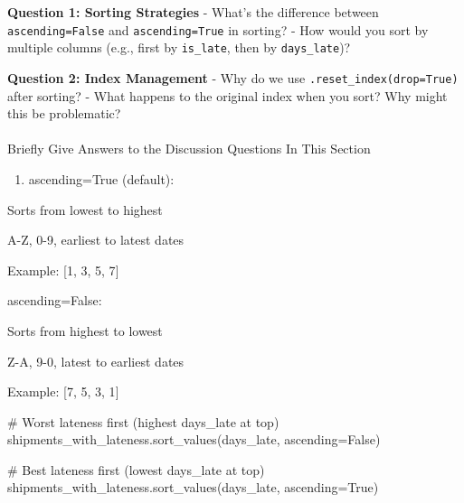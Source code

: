 \documentclass[
  letterpaper,
  DIV=11,
  numbers=noendperiod]{scrartcl}
\makeatletter
\let\oldparagraph\paragraph
\renewcommand{\paragraph}{
    \@ifstar
      \xxxParagraphStar
      \xxxParagraphNoStar
  }
\newcommand{\xxxParagraphStar}[1]{\oldparagraph*{#1}\mbox{}}
\newcommand{\xxxParagraphNoStar}[1]{\oldparagraph{#1}\mbox{}}
\newenvironment{Shaded}{\begin{snugshade}}{\end{snugshade}}
\newcommand{\CommentTok}[1]{\textcolor[rgb]{0.37,0.37,0.37}{#1}}
\newcommand{\NormalTok}[1]{\textcolor[rgb]{0.00,0.23,0.31}{#1}}
\newcommand{\OperatorTok}[1]{\textcolor[rgb]{0.37,0.37,0.37}{#1}}
\newcommand{\StringTok}[1]{\textcolor[rgb]{0.13,0.47,0.30}{#1}}
\newcommand{\VariableTok}[1]{\textcolor[rgb]{0.07,0.07,0.07}{#1}}
\providecommand{\tightlist}{%
  \setlength{\itemsep}{0pt}\setlength{\parskip}{0pt}}
\makeatother
\begin{document}
\begin{tcolorbox}[enhanced jigsaw, toptitle=1mm, opacityback=0, colframe=quarto-callout-important-color-frame, leftrule=.75mm, arc=.35mm, opacitybacktitle=0.6, breakable, titlerule=0mm, coltitle=black, bottomtitle=1mm, title=\textcolor{quarto-callout-important-color}{\faExclamation}\hspace{0.5em}{🤔 Discussion Questions: Sort Mental Model}, colbacktitle=quarto-callout-important-color!10!white, rightrule=.15mm, left=2mm, bottomrule=.15mm, toprule=.15mm, colback=white]

\textbf{Question 1: Sorting Strategies} - What's the difference between
\texttt{ascending=False} and \texttt{ascending=True} in sorting? - How
would you sort by multiple columns (e.g., first by \texttt{is\_late},
then by \texttt{days\_late})?

\textbf{Question 2: Index Management} - Why do we use
\texttt{.reset\_index(drop=True)} after sorting? - What happens to the
original index when you sort? Why might this be problematic?

\end{tcolorbox}

\paragraph{Briefly Give Answers to the Discussion Questions In This
Section}\label{briefly-give-answers-to-the-discussion-questions-in-this-section-3}

\begin{enumerate}
\def\labelenumi{\arabic{enumi}.}
\tightlist
\item
  ascending=True (default):
\end{enumerate}

Sorts from lowest to highest

A-Z, 0-9, earliest to latest dates

Example: {[}1, 3, 5, 7{]}

ascending=False:

Sorts from highest to lowest

Z-A, 9-0, latest to earliest dates

Example: {[}7, 5, 3, 1{]}

\begin{Shaded}
\begin{Highlighting}[]
\CommentTok{\# Worst lateness first (highest days\_late at top)}
\NormalTok{shipments\_with\_lateness.sort\_values(}\StringTok{\textquotesingle{}days\_late\textquotesingle{}}\NormalTok{, ascending}\OperatorTok{=}\VariableTok{False}\NormalTok{)}

\CommentTok{\# Best lateness first (lowest days\_late at top)  }
\NormalTok{shipments\_with\_lateness.sort\_values(}\StringTok{\textquotesingle{}days\_late\textquotesingle{}}\NormalTok{, ascending}\OperatorTok{=}\VariableTok{True}\NormalTok{)}
\end{Highlighting}
\end{Shaded}
\end{document}
